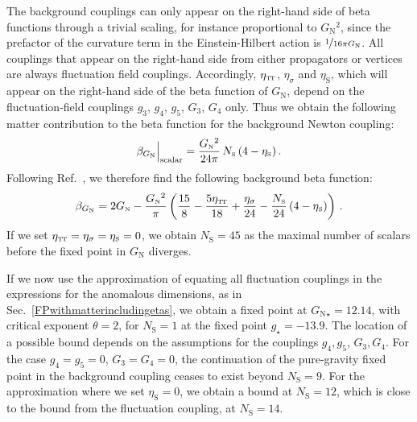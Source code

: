 \documentclass[11pt]{book}
\newcommand\TTspace{ -1pt }
\newcommand\etaTT{ \eta_{\scriptscriptstyle{\mathrm{T\hspace{\TTspace}T}}} }
\newcommand\etaS{ \eta_{\scriptscriptstyle{\mathrm{S}}} }
\newcommand\NS{ N_{\scriptscriptstyle{\mathrm{S}}} }
\newcommand\GNewton{ G_{\scriptscriptstyle{\mathrm{N}}}{} }
\newcommand\Gback{ \GNewton } %
\numberwithin{equation}{chapter}
\begin{document}
The background couplings can only appear on the right-hand side of beta functions through a trivial scaling,
for instance proportional to $\Gback^2$, since the prefactor of the curvature term in the Einstein-Hilbert
action is $\nicefrac{1}{16 \pi \Gback}$.
All couplings that appear on the right-hand side from either propagators or vertices are always
fluctuation field couplings.
Accordingly, $\etaTT$, $\eta_{\sigma}$ and $\etaS$,
which will appear on the right-hand side of the beta function of $\Gback$,
depend on the fluctuation-field couplings $g_3$, $g_4$, $g_5$, $G_3$, $G_4$ only.
Thus we obtain the following matter contribution to the beta function for the background Newton coupling:
\begin{align}
  \beta_{\Gback} \Big|_{\rm scalar} = \frac{\Gback^2}{24 \pi} \, \NS \, (4-\etaS) \,.
\end{align}
Following Ref.~\cite{Percacci:2015wwa}, we therefore find the following background beta function:
\begin{align}
  \beta_{\Gback} = 2 \Gback
    - \frac{\Gback^2}{\pi}
  \left(
      \frac{15}{8}
    - \frac{5\etaTT}{18}
    + \frac{\eta_{\sigma}}{24}
    -  \frac{\NS}{24} \, (4 - \etaS)
  \right) \,.
\end{align}
If we set $\etaTT = \eta_{\sigma} = \etaS = 0$, we obtain $\NS=45$ as the maximal
number of scalars before the fixed point in $\Gback$ diverges.

If we now use the approximation of equating all fluctuation couplings in the expressions
for the anomalous dimensions, as in Sec.~\ref{FPwithmatterincludingetas},
we obtain a fixed point at $\Gback_{\star}=12.14$, with critical exponent $\theta=2$,
for $\NS=1$ at the fixed point $g_{\star}=-13.9$.
The location of a possible bound depends on the assumptions for the couplings $g_4, g_5$, $G_3, G_4$.
For the case $g_4 = g_5 = 0$, $G_3 = G_4 = 0$,
the continuation of the pure-gravity fixed point in the background coupling ceases to exist beyond $\NS=9$.
For the approximation where we set $\etaS = 0$, we obtain a bound at $\NS=12$,
which is close to the bound from the fluctuation coupling, at $\NS=14$.
\end{document}
